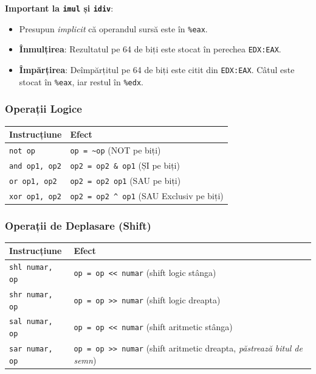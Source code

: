 \documentclass[12pt,a4paper]{article}
\begin{document}
\textbf{Important la \texttt{imul} și \texttt{idiv}}:
\begin{itemize}
    \item Presupun \textit{implicit} că operandul sursă este în \texttt{\%eax}.
    \item \textbf{Înmulțirea}: Rezultatul pe 64 de biți este stocat în perechea \texttt{EDX:EAX}.
    \item \textbf{Împărțirea}: Deîmpărțitul pe 64 de biți este citit din \texttt{EDX:EAX}. Câtul este stocat în \texttt{\%eax}, iar restul în \texttt{\%edx}.
\end{itemize}

\subsubsection{Operații Logice}
\begin{table}[ht!]
\centering
\begin{tabular}{ll}
\toprule
\textbf{Instrucțiune} & \textbf{Efect} \\
\midrule
\texttt{not op} & \texttt{op = \textasciitilde op} (NOT pe biți) \\
\texttt{and op1, op2} & \texttt{op2 = op2 \& op1} (ȘI pe biți) \\
\texttt{or op1, op2} & \texttt{op2 = op2 \textbar{} op1} (SAU pe biți) \\
\texttt{xor op1, op2} & \texttt{op2 = op2 \textasciicircum{} op1} (SAU Exclusiv pe biți) \\
\bottomrule
\end{tabular}
\end{table}

\subsubsection{Operații de Deplasare (Shift)}
\begin{table}[ht!]
\centering
\begin{tabular}{ll}
\toprule
\textbf{Instrucțiune} & \textbf{Efect} \\
\midrule
\texttt{shl numar, op} & \texttt{op = op << numar} (shift logic stânga) \\
\texttt{shr numar, op} & \texttt{op = op >> numar} (shift logic dreapta) \\
\texttt{sal numar, op} & \texttt{op = op << numar} (shift aritmetic stânga) \\
\texttt{sar numar, op} & \texttt{op = op >> numar} (shift aritmetic dreapta, \textit{păstrează bitul de semn}) \\
\bottomrule
\end{tabular}
\end{table}
\end{document}
